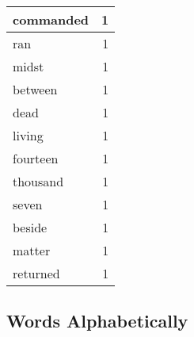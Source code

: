 \begin{center}
\begin{longtable}{l|r}
commanded & 1 \\ \hline
ran & 1 \\ \hline
midst & 1 \\ \hline
between & 1 \\ \hline
dead & 1 \\ \hline
living & 1 \\ \hline
fourteen & 1 \\ \hline
thousand & 1 \\ \hline
seven & 1 \\ \hline
beside & 1 \\ \hline
matter & 1 \\ \hline
returned & 1 \\ \hline
\end{longtable}
\end{center}



\normalsize



\subsection{Words Alphabetically}

